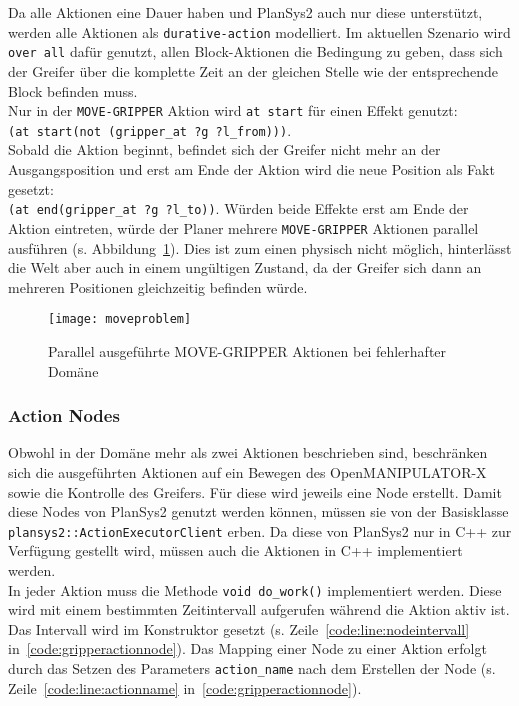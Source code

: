 Da alle Aktionen eine Dauer haben und \ac{PlanSys2} auch nur diese unterstützt, werden alle Aktionen als \verb|durative-action| modelliert.
Im aktuellen Szenario wird \verb|over all| dafür genutzt, allen Block-Aktionen die Bedingung zu geben, dass sich der Greifer über die komplette Zeit an der gleichen Stelle wie der entsprechende Block befinden muss.\\
Nur in der \verb|MOVE-GRIPPER| Aktion wird \verb|at start| für einen Effekt genutzt:\\
\verb|(at start(not (gripper_at ?g ?l_from)))|.\\
Sobald die Aktion beginnt, befindet sich der Greifer nicht mehr an der Ausgangsposition und erst am Ende der Aktion wird die neue Position als Fakt gesetzt:\\
\verb|(at end(gripper_at ?g ?l_to))|.
Würden beide Effekte erst am Ende der Aktion eintreten, würde der Planer mehrere \verb|MOVE-GRIPPER| Aktionen parallel ausführen (s. Abbildung~\ref{fig:tempgrippereffect}).
Dies ist zum einen physisch nicht möglich, hinterlässt die Welt aber auch in einem ungültigen Zustand, da der Greifer sich dann an mehreren Positionen gleichzeitig befinden würde.
\begin{figure}[ht!]
    \centering
    \texttt{[image: moveproblem]}
    \caption{Parallel ausgeführte MOVE-GRIPPER Aktionen bei fehlerhafter Domäne}
    \label{fig:tempgrippereffect}
\end{figure}

\subsubsection{Action Nodes}
Obwohl in der Domäne mehr als zwei Aktionen beschrieben sind, beschränken sich die ausgeführten Aktionen auf ein Bewegen des OpenMANIPULATOR-X sowie die Kontrolle des Greifers.
Für diese wird jeweils eine Node erstellt.
Damit diese Nodes von \ac{PlanSys2} genutzt werden können, müssen sie von der Basisklasse \verb|plansys2::ActionExecutorClient| erben.
Da diese von \ac{PlanSys2} nur in C++ zur Verfügung gestellt wird, müssen auch die Aktionen in C++ implementiert werden.\\
In jeder Aktion muss die Methode \verb|void do_work()| implementiert werden.
Diese wird mit einem bestimmten Zeitintervall aufgerufen während die Aktion aktiv ist.
Das Intervall wird im Konstruktor gesetzt (s. Zeile~\ref{code:line:nodeintervall} in~\ref{code:gripperactionnode}).
Das Mapping einer Node zu einer Aktion erfolgt durch das Setzen des Parameters \verb|action_name| nach dem Erstellen der Node (s. Zeile~\ref{code:line:actionname} in~\ref{code:gripperactionnode}).

